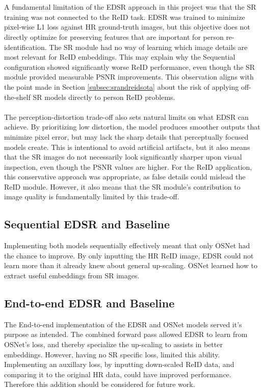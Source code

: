 \\\\
A fundamental limitation of the \acs{EDSR} approach in this project was that the \acs{SR} training was not connected to the \acs{ReID} task. \acs{EDSR} was trained to minimize pixel-wise L1 loss against \acs{HR} ground-truth images, but this objective does not directly optimize for preserving features that are important for person re-identification. The \acs{SR} module had no way of learning which image details are most relevant for \acs{ReID} embeddings. This may explain why the Sequential configuration showed significantly worse \acs{ReID} performance, even though the \acs{SR} module provided measurable \acs{PSNR} improvements. This observation aligns with the point made in Section \ref{subsec:srandreidsota} about the risk of applying off-the-shelf \acs{SR} models directly to person \acs{ReID} problems.
\\\\
The perception-distortion trade-off also sets natural limits on what \acs{EDSR} can achieve. By prioritizing low distortion, the model produces smoother outputs that minimize pixel error, but may lack the sharp details that perceptually focused models create. This is intentional to avoid artificial artifacts, but it also means that the \acs{SR} images do not necessarily look significantly sharper upon visual inspection, even though the \acs{PSNR} values are higher. For the \acs{ReID} application, this conservative approach was appropriate, as false details could mislead the \acs{ReID} module. However, it also means that the \acs{SR} module's contribution to image quality is fundamentally limited by this trade-off.


\subsection{Sequential EDSR and Baseline}
Implementing both models sequentially effectively meant that only \acs{OSNet} had the chance to improve. By only inputting the \acs{HR} \acs{ReID} image, \acs{EDSR} could not learn more than it already knew about general up-scaling. \acs{OSNet} learned how to extract useful embeddings from \acs{SR} images. 

\subsection{End-to-end EDSR and Baseline}

The End-to-end implementation of the \acs{EDSR} and \acs{OSNet} models served it's purpose as intended. The combined forward pass allowed \acs{EDSR} to learn from \acs{OSNet}'s loss, and thereby specialize the up-scaling to assists in better embeddings. However, having no \acs{SR} specific loss, limited this ability. Implementing an auxillary loss, by inputting down-scaled \acs{ReID} data, and comparing it to the original \acs{HR} data, could have improved performance. Therefore this addition should be considered for future work. 

